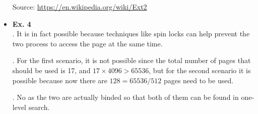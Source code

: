 \documentclass{article}
\begin{document}
\begin{itemize}
{\color{blue} Source: }\url{https://en.wikipedia.org/wiki/Ext2}

\item {\bf Ex. 4}\\

{. It is in fact possible because techniques like spin locks can help prevent the two process to access the page at the same time.}


{. For the first scenario, it is not possible since the total number of pages that should be used is 17, and $17\times 4096>65536$, but for the second scenario it is possible because now there are $128=65536/512$ pages need to be used.\\}

{. No as the two are actually binded so that both of them can be found in one-level search.\\}




\end{itemize}
\end{document}

